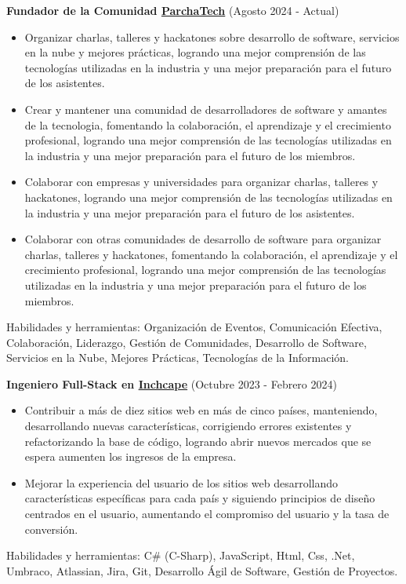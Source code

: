   \vspace{0.2cm}
  \textbf{Fundador de la Comunidad \href{https://www.parcha.tech/}{ParchaTech}} (Agosto 2024 - Actual)
  \hfill
  \vspace{0.2cm}
  \begin{minipage}{\linewidth}
    \begin{itemize}[noitemsep]
      \item Organizar charlas, talleres y hackatones sobre desarrollo de software, servicios en la nube y mejores prácticas, logrando una mejor comprensión de las tecnologías utilizadas en la industria y una mejor preparación para el futuro de los asistentes.
      \item Crear y mantener una comunidad de desarrolladores de software y amantes de la tecnologia, fomentando la colaboración, el aprendizaje y el crecimiento profesional, logrando una mejor comprensión de las tecnologías utilizadas en la industria y una mejor preparación para el futuro de los miembros.
      \item Colaborar con empresas y universidades para organizar charlas, talleres y hackatones, logrando una mejor comprensión de las tecnologías utilizadas en la industria y una mejor preparación para el futuro de los asistentes.
      \item Colaborar con otras comunidades de desarrollo de software para organizar charlas, talleres y hackatones, fomentando la colaboración, el aprendizaje y el crecimiento profesional, logrando una mejor comprensión de las tecnologías utilizadas en la industria y una mejor preparación para el futuro de los miembros.
    \end{itemize}
    \hfill
  \end{minipage}
  Habilidades y herramientas: Organización de Eventos, Comunicación Efectiva, Colaboración, Liderazgo, Gestión de Comunidades, Desarrollo de Software, Servicios en la Nube, Mejores Prácticas, Tecnologías de la Información.
  \newpage

  \vspace*{0.2cm}
  \textbf{Ingeniero Full-Stack en \href{https://www.inchcape.com/}{Inchcape}} (Octubre 2023 - Febrero 2024)
  \hfill
  \vspace*{0.2cm}
  \begin{minipage}{\linewidth}
    \begin{itemize}[noitemsep]
      \item Contribuir a más de diez sitios web en más de cinco países, manteniendo, desarrollando nuevas características, corrigiendo errores existentes y refactorizando la base de código, logrando abrir nuevos mercados que se espera aumenten los ingresos de la empresa.
      \item Mejorar la experiencia del usuario de los sitios web desarrollando características específicas para cada país y siguiendo principios de diseño centrados en el usuario, aumentando el compromiso del usuario y la tasa de conversión.
    \end{itemize}
    \hfill
  \end{minipage}
  Habilidades y herramientas: C\# (C-Sharp), JavaScript, Html, Css, .Net, Umbraco, Atlassian, Jira, Git, Desarrollo Ágil de Software, Gestión de Proyectos.

